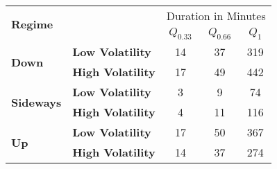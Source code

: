\centering
\begin{tabular}{ll|ccc}
    \toprule
    \multicolumn{2}{l|}{\multirow{2}{*}{\textbf{Regime}}} & \multicolumn{3}{c}{Duration in Minutes} \\
    \multicolumn{2}{l|}{} & $Q_{0.33}$ & $Q_{0.66}$ & $Q_{1}$ \\
    \midrule
    \multirow{2}{*}{\textbf{Down}}     & \textbf{Low Volatility}  & 14 & 37 & 319 \\
    & \textbf{High Volatility} & 17 & 49 & 442 \\
    \midrule
    \multirow{2}{*}{\textbf{Sideways}} & \textbf{Low Volatility}  & 3  & 9  & 74  \\
    & \textbf{High Volatility} & 4  & 11 & 116 \\
    \midrule
    \multirow{2}{*}{\textbf{Up}}       & \textbf{Low Volatility}  & 17 & 50 & 367 \\
    & \textbf{High Volatility} & 14 & 37 & 274 \\
    \bottomrule
\end{tabular}